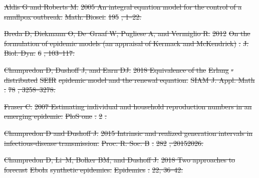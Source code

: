\documentclass[12pt]{article}
\providecommand{\DIFdeltex}[1]{{\protect\color{red}\sout{#1}}}                      %
\providecommand{\DIFdel}[1]{\texorpdfstring{\DIFdeltex{#1}}{}} %
\begin{document}
\DIFdel{Aldis G and Roberts M.
}%
\DIFdel{2005 An integral equation model for the control of a smallpox
  outbreak.
}%
\DIFdel{Math. Biosci.}%
\DIFdel{195}%
\DIFdel{, 1--22.
}%

\DIFdel{Breda D, Diekmann O, De~Graaf W, Pugliese A, and Vermiglio R.
}%
\DIFdel{2012 }%
\DIFdel{On the formulation of epidemic models (an appraisal of Kermack
  and McKendrick)}%
\DIFdel{.
}%
\DIFdel{J. Biol. Dyn.}%
\DIFdel{6}%
\DIFdel{, 103--117.
}%

\DIFdel{Champredon D, Dushoff J, and Earn DJ.
}%
\DIFdel{2018 Equivalence of the }%
\DIFdel{Erlang}%
\DIFdel{-distributed }%
\DIFdel{SEIR}%
\DIFdel{epidemic model
  and the renewal equation.
}%
\DIFdel{SIAM J. Appl. Math}%
\DIFdel{.
}%
\DIFdel{78}%
\DIFdel{, 3258--3278.
}%

\DIFdel{Fraser C.
}%
\DIFdel{2007 Estimating individual and household reproduction numbers in an
  emerging epidemic.
}%
\DIFdel{PloS one}%
\DIFdel{.
}%
\DIFdel{2}%
\DIFdel{.
}%

\DIFdel{Champredon D and Dushoff J.
}%
\DIFdel{2015 Intrinsic and realized generation intervals in
  infectious-disease transmission.
}%
\DIFdel{Proc. R. Soc. B}%
\DIFdel{.
}%
\DIFdel{282}%
\DIFdel{, 20152026.
}%

\DIFdel{Champredon D, Li~M, Bolker BM, and Dushoff J.
}%
\DIFdel{2018 Two approaches to forecast }%
\DIFdel{Ebola}%
\DIFdel{synthetic epidemics.
}%
\DIFdel{Epidemics}%
\DIFdel{.
}%
\DIFdel{22, 36--42.
}%
\end{document}
